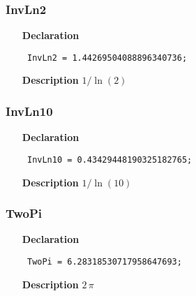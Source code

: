 \documentclass[12pt,a4paper,oneside]{report}
\newcommand{\declarationitem}[1]{\textbf{#1}}
\newcommand{\descriptiontitle}[1]{\textbf{#1}}
\newcommand{\code}[1]{\texttt{#1}}
\begin{document}
\subsubsection{InvLn2}
\label{utypes-InvLn2}
\begin{itemize}\item[\declarationitem{Declaration}\hfill]
	\begin{flushleft}
		\code{
			InvLn2     = 1.44269504088896340736;}
		
	\end{flushleft}
	
	\par
	\item[\descriptiontitle{Description}]
	$1/\ln(2)$
	
\end{itemize}
\subsubsection{InvLn10}
\label{utypes-InvLn10}
\begin{itemize}\item[\declarationitem{Declaration}\hfill]
	\begin{flushleft}
		\code{
			InvLn10    = 0.43429448190325182765;}
		
	\end{flushleft}
	
	\par
	\item[\descriptiontitle{Description}]
	$1/\ln(10)$
	
\end{itemize}
\subsubsection{TwoPi}
\label{utypes-TwoPi}
\begin{itemize}\item[\declarationitem{Declaration}\hfill]
	\begin{flushleft}
		\code{
			TwoPi      = 6.28318530717958647693;}
		
	\end{flushleft}
	
	\par
	\item[\descriptiontitle{Description}]
	$2\,\pi$
	
\end{itemize}
\end{document}
